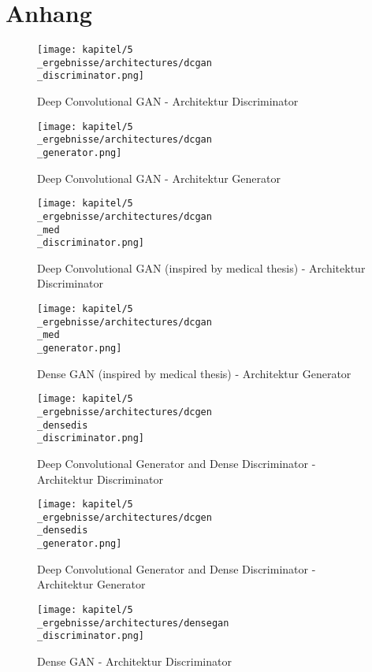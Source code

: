\chapter{Anhang}

\begin{figure}[H]
	\centering
	\texttt{[image: kapitel/5\\\_ergebnisse/architectures/dcgan\\\_discriminator.png]}
	\caption{Deep Convolutional GAN - Architektur Discriminator}
	\label{architecture:dcgan-dis}
\end{figure}

\begin{figure}[H]
	\centering
	\texttt{[image: kapitel/5\\\_ergebnisse/architectures/dcgan\\\_generator.png]}
	\caption{Deep Convolutional GAN - Architektur Generator}
	\label{architecture:dcgan-gen}
\end{figure}

\begin{figure}[H]
	\centering
	\texttt{[image: kapitel/5\\\_ergebnisse/architectures/dcgan\\\_med\\\_discriminator.png]}
	\caption{Deep Convolutional GAN (inspired by medical thesis) - Architektur Discriminator}
	\label{architecture:dcgan-med-dis}
\end{figure}

\begin{figure}[H]
	\centering
	\texttt{[image: kapitel/5\\\_ergebnisse/architectures/dcgan\\\_med\\\_generator.png]}
	\caption{Dense GAN (inspired by medical thesis) - Architektur Generator}
	\label{architecture:dcgan-med-gen}
\end{figure}

\begin{figure}[H]
	\centering
	\texttt{[image: kapitel/5\\\_ergebnisse/architectures/dcgen\\\_densedis\\\_discriminator.png]}
	\caption{Deep Convolutional Generator and Dense Discriminator - Architektur Discriminator}
	\label{architecture:dcgen-densedis-dis}
\end{figure}

\begin{figure}[H]
	\centering
	\texttt{[image: kapitel/5\\\_ergebnisse/architectures/dcgen\\\_densedis\\\_generator.png]}
	\caption{Deep Convolutional Generator and Dense Discriminator - Architektur Generator}
	\label{architecture:dcgen-densedis-gen}
\end{figure}

\begin{figure}[H]
	\centering
	\texttt{[image: kapitel/5\\\_ergebnisse/architectures/densegan\\\_discriminator.png]}
	\caption{Dense GAN - Architektur Discriminator}
	\label{architecture:densegan-dis}
\end{figure}

